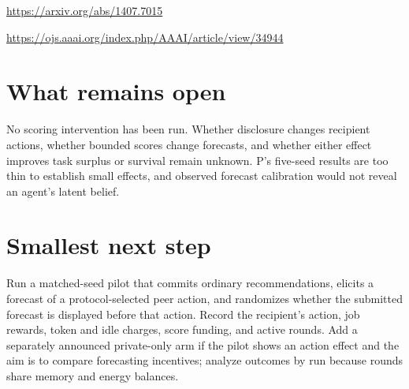 \documentclass{article}
\begin{document}
\noindent
\url{https://arxiv.org/abs/1407.7015}

\noindent
\url{https://ojs.aaai.org/index.php/AAAI/article/view/34944}

\section*{What remains open}

No scoring intervention has been run. Whether disclosure changes recipient actions, whether bounded scores change forecasts, and whether either effect improves task surplus or survival remain unknown. P's five-seed results are too thin to establish small effects, and observed forecast calibration would not reveal an agent's latent belief. 

\section*{Smallest next step}

Run a matched-seed pilot that commits ordinary recommendations, elicits a forecast of a protocol-selected peer action, and randomizes whether the submitted forecast is displayed before that action. Record the recipient's action, job rewards, token and idle charges, score funding, and active rounds. Add a separately announced private-only arm if the pilot shows an action effect and the aim is to compare forecasting incentives; analyze outcomes by run because rounds share memory and energy balances. 
\end{document}
